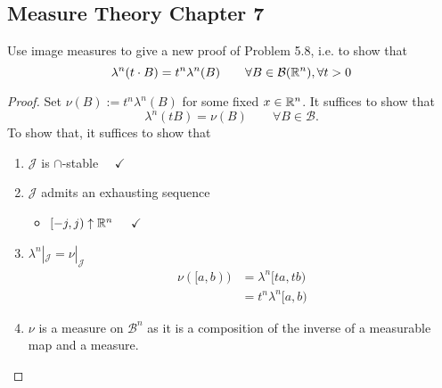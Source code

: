 \subsection{Measure Theory Chapter 7}
\begin{thm}[Problem 7.7]
Use image measures to give a new proof of Problem 5.8, i.e. to show that
\[
\lambda ^n(t\cdot B)=t^n\lambda ^n(B) \qquad \forall B\in \mathcal{B}(\Bbb{R}^n),\forall t>0
\]
\end{thm}

\begin{proof}
Set \(\nu (B):=t^n\lambda ^n(B)\) for some fixed \(x\in \Bbb{R}^n\). It suffices to show that
\[
\lambda ^n(tB)=\nu (B)\qquad \forall B\in \mathcal{B}.
\]
To show that, it suffices to show that

\begin{enumerate}
  \item \(\mathcal{J}\) is \(\cap \)-stable $\quad \checkmark$
  \item \(\mathcal{J}\) admits an exhausting sequence
\begin{itemize}
  \item \([-j,j)\uparrow \Bbb{R}^n\) \(\quad \checkmark\)
\end{itemize}
  \item \(\lambda ^n|_\mathcal{J}=\nu |_\mathcal{J}\)
\begin{align*}
\nu ([a,b))&=\lambda ^n[ta,tb) \\
&=t^n\lambda ^n[a,b)
\end{align*}
  \item \(\nu \) is a measure on \(\mathcal{B}^n\) as it is a composition of the inverse of a  measurable map and a measure.
\end{enumerate}
\end{proof}





